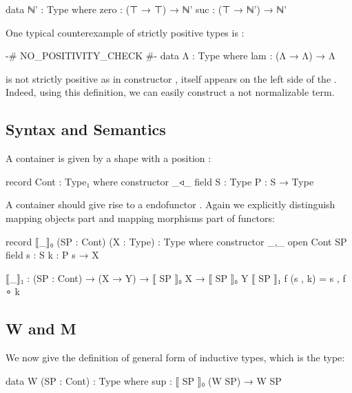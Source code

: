 \begin{code}
data ℕ' : Type where
  zero : (⊤ → ⊤) → ℕ'
  suc : (⊤ → ℕ') → ℕ'
\end{code}

One typical counterexample of strictly positive types is :

\begin{code}
{-# NO_POSITIVITY_CHECK #-}
data Λ : Type where
  lam : (Λ → Λ) → Λ
\end{code}

 is not strictly positive as in constructor ,  itself appears on the left side of the . Indeed, using this definition, we can easily construct a not normalizable term.

\subsection{Syntax and Semantics}

A container is given by a shape  \AgdaSymbol{:}  with a position  \AgdaSymbol{:}   :

\begin{code}
record Cont : Type₁ where
  constructor _◃_
  field
    S : Type
    P : S → Type
\end{code}

A container should give rise to a endofunctor   . Again we explicitly distinguish mapping objects part and mapping morphisms part of functors:

\begin{code}
record ⟦_⟧₀ (SP : Cont) (X : Type) : Type where
  constructor _,_
  open Cont SP
  field
    s : S
    k : P s → X

⟦_⟧₁ : (SP : Cont) → (X → Y) → ⟦ SP ⟧₀ X → ⟦ SP ⟧₀ Y
⟦ SP ⟧₁ f (s , k) = s , f ∘ k
\end{code}

\subsection{W and M}

We now give the definition of general form of inductive types, which is the  type:

\begin{code}
data W (SP : Cont) : Type where
  sup : ⟦ SP ⟧₀ (W SP) → W SP
\end{code}

